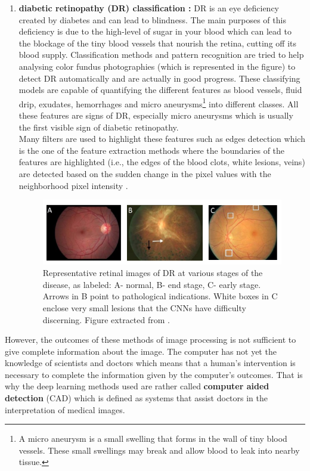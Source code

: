 \documentclass[11pt, openany]{report}
\theoremstyle{plain}
\theoremstyle{definition}
\theoremstyle{remark}
\begin{document}
\begin{enumerate}
\item \textbf{diabetic retinopathy (DR) classification :} DR is an eye deficiency created by diabetes and can lead to blindness. The main purposes of this deficiency is due to the high-level of sugar in your blood which can lead to the blockage of the tiny blood vessels that nourish the retina, cutting off its blood supply. Classification methods and pattern recognition are tried to help analysing color fundus photographies (which is represented in the figure) to detect DR automatically and are actually in good progress. These classifying models are capable of quantifying the different features as blood vessels, fluid drip, exudates, hemorrhages and micro aneurysms\footnote{A micro aneurysm is a small swelling that forms in the wall of tiny blood vessels. These small swellings may break and allow blood to leak into nearby tissue.} into different classes. All these features are signs of DR, especially micro aneurysms which is usually the first visible sign of diabetic retinopathy. \\
Many filters are used to highlight these features such as edges detection which is the one of the feature extraction methods where the boundaries of the features are highlighted (i.e., the edges of the blood clots, white lesions, veins) are detected based on the sudden change in the pixel values with the neighborhood pixel intensity \cite{DR-1}.

\begin{figure}[h]
  \centering
  \includegraphics[scale=0.6]{figures/DR-images-examples.png}
  \caption{Representative retinal images of DR at various stages of the disease, as labeled: A- normal, B- end stage, C- early stage. Arrows in B point to pathological indications. White boxes in C enclose very small lesions that the CNNs have difficulty discerning. Figure extracted from \cite{DR-2}.}
  \label{fig:DR-example}
\end{figure}

\end{enumerate}

\newpage
However, the outcomes of these methods of image processing is not sufficient to give complete information about the image. The computer has not yet the knowledge of scientists and doctors which means that a human's intervention is necessary to complete the information given by the computer's outcomes. That is why the deep learning methods used are rather called \textbf{computer aided detection} (CAD) which is defined as systems that assist doctors in the interpretation of medical images. \\
\end{document}
